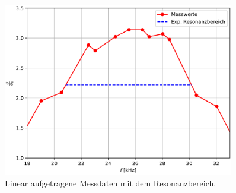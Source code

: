 \begin{figure}[H]
  \centering
  \includegraphics[width=0.90\textwidth]{plot_c.pdf}
  \caption{Linear aufgetragene Messdaten mit dem Resonanzbereich.}
  \label{fig:Resonanzbereich}
\end{figure}

